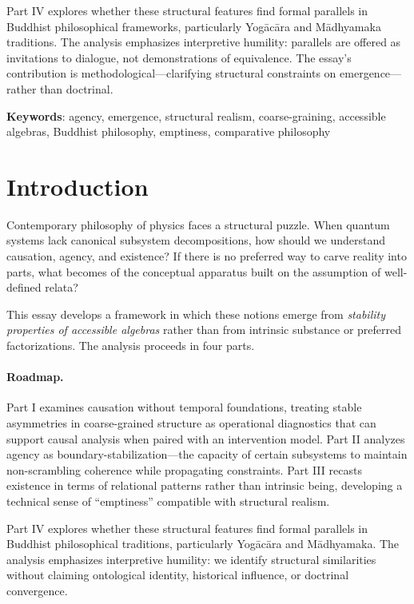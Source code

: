 \documentclass[12pt,a4paper,openany]{book}
\begin{document}
Part IV explores whether these structural features find formal parallels in Buddhist philosophical frameworks, particularly Yog\=ac\=ara and M\=adhyamaka traditions. The analysis emphasizes interpretive humility: parallels are offered as invitations to dialogue, not demonstrations of equivalence. The essay's contribution is methodological—clarifying structural constraints on emergence—rather than doctrinal.

\medskip

\noindent\textbf{Keywords}: agency, emergence, structural realism, coarse-graining, accessible algebras, Buddhist philosophy, emptiness, comparative philosophy


\tableofcontents

\section{Introduction}
\label{H-C-sec:intro}

Contemporary philosophy of physics faces a structural puzzle. When quantum systems lack canonical subsystem decompositions, how should we understand causation, agency, and existence? If there is no preferred way to carve reality into parts, what becomes of the conceptual apparatus built on the assumption of well-defined relata?

This essay develops a framework in which these notions emerge from \emph{stability properties of accessible algebras} rather than from intrinsic substance or preferred factorizations. The analysis proceeds in four parts.

\paragraph{Roadmap.}
Part I examines causation without temporal foundations, treating stable asymmetries in coarse-grained structure as operational diagnostics that can support causal analysis when paired with an intervention model. Part II analyzes agency as boundary-stabilization—the capacity of certain subsystems to maintain non-scrambling coherence while propagating constraints. Part III recasts existence in terms of relational patterns rather than intrinsic being, developing a technical sense of ``emptiness'' compatible with structural realism.

Part IV explores whether these structural features find formal parallels in Buddhist philosophical traditions, particularly Yog\=ac\=ara and M\=adhyamaka. The analysis emphasizes interpretive humility: we identify structural similarities without claiming ontological identity, historical influence, or doctrinal convergence.
\end{document}
